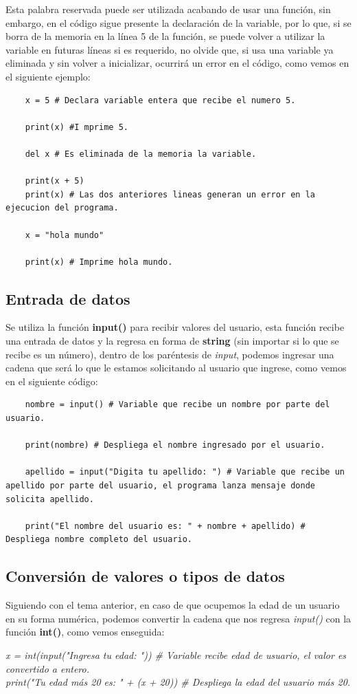 Esta palabra reservada puede ser utilizada acabando de usar una función, sin embargo, en el código sigue presente la declaración de la variable, por lo que, si se borra de la memoria en la línea 5 de la función, se puede volver a utilizar la variable en futuras líneas si es requerido, no olvide que, si usa una variable ya eliminada y sin volver a inicializar, ocurrirá un error en el código, como vemos en el siguiente ejemplo:
\begin{lstlisting}
	x = 5 # Declara variable entera que recibe el numero 5.
	
	print(x) #I mprime 5.
	
	del x # Es eliminada de la memoria la variable.
	
	print(x + 5)
	print(x) # Las dos anteriores lineas generan un error en la ejecucion del programa.
	
	x = "hola mundo"
	
	print(x) # Imprime hola mundo.
\end{lstlisting}


\subsection{Entrada de datos}
\hspace{0.55cm}Se utiliza la función \textbf{input()} para recibir valores del usuario, esta función recibe una entrada de datos y la regresa en forma de \textbf{string} (sin importar si lo que se recibe es un número), dentro de los paréntesis de \textit{input}, podemos ingresar una cadena que será lo que le estamos solicitando al usuario que ingrese, como vemos en el siguiente código:
\begin{lstlisting}
	nombre = input() # Variable que recibe un nombre por parte del usuario.
	
	print(nombre) # Despliega el nombre ingresado por el usuario.
	
	apellido = input("Digita tu apellido: ") # Variable que recibe un apellido por parte del usuario, el programa lanza mensaje donde solicita apellido.
	
	print("El nombre del usuario es: " + nombre + apellido) # Despliega nombre completo del usuario.
\end{lstlisting}


\subsection{Conversión de valores o tipos de datos}
\hspace{0.55cm}Siguiendo con el tema anterior, en caso de que ocupemos la edad de un usuario en su forma numérica, podemos convertir la cadena que nos regresa \textit{input()} con la función \textbf{int()}, como vemos enseguida:
\begin{center}
	\textit{
		x = int(input("Ingresa tu edad: ")) \# Variable recibe edad de usuario, el valor es convertido a entero. \\
		print("Tu edad más 20 es: " + (x + 20)) \# Despliega la edad del usuario más 20.
	}
\end{center}

